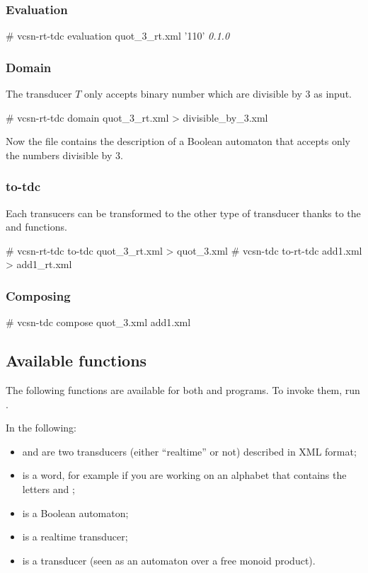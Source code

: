 \subsubsection{Evaluation}

\begin{shell}
# vcsn-rt-tdc evaluation quot_3_rt.xml '110'
\textit{0.1.0}
\end{shell}

\subsubsection{Domain}
The transducer $T$ only accepts binary number which are divisible by 3
as input.
\begin{shell}
# vcsn-rt-tdc domain quot_3_rt.xml > divisible_by_3.xml
\end{shell}
Now the file  contains the description of a
Boolean automaton that accepts only the numbers divisible by 3.

\subsubsection{to-tdc}
Each transucers can be transformed to the other type of transducer
thanks to the  and  functions.
\begin{shell}
# vcsn-rt-tdc to-tdc quot_3_rt.xml > quot_3.xml
# vcsn-tdc to-rt-tdc add1.xml > add1_rt.xml
\end{shell}

\subsubsection{Composing}
\begin{shell}
# vcsn-tdc compose quot_3.xml add1.xml
\end{shell}

\subsection{Available functions}
The following functions are available for both 
and  programs.  To invoke them, run
.

\smallskip

In the following:

\begin{itemize}
\item {} and  are two transducers (either ``realtime''
  or not) described in \Vauc XML format;
\item {} is a word, for example  if you are working
  on an alphabet that contains the letters  and ;
\item {} is a Boolean automaton;
\item {} is a realtime transducer;
\item {} is a transducer (seen as an automaton over a free
  monoid product).
\end{itemize}

